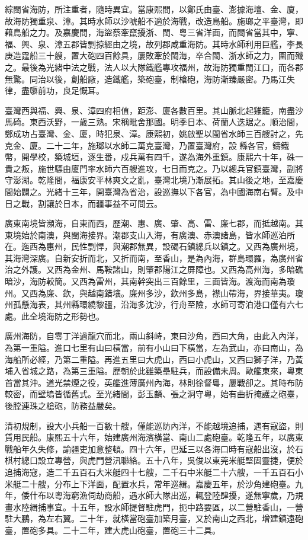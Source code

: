 \begin{pinyinscope}
綜閩省海防，所注重者，隨時異宜。當康熙間，以鄭氏由臺、澎據海壇、金、廈，故海防獨重泉、漳。其時水師以沙唬船不適於海戰，改造鳥船。施瑯之平臺灣，即藉鳥船之力。及嘉慶間，海盜蔡牽竄擾浙、閩、粵三省洋面，而閩省當其中，寧、福、興、泉、漳五郡皆剽掠經由之境，故列郡咸重海防。其時水師利用巨艦，李長庚造霆船三十艘，置大砲四百餘具，屢敗牽於閩海，卒合閩、浙水師之力，圍而殲之。最後為光緒中法之戰，法人以大隊鐵艦專攻福州，故海防獨重閩江口，而各郡無驚。同治以後，創船廠，造鐵艦，築砲臺，制槍砲，海防漸臻嚴密。乃馬江失律，盡隳前功，良足慨耳。

臺灣西與福、興、泉、漳四府相值，距澎、廈各數百里。其山脈北起雞籠，南盡沙馬碕。東西沃野，一歲三熟。宋稱毗舍那國。明季日本、荷蘭人迭踞之。順治間，鄭成功占臺灣、金、廈，時犯泉、漳。康熙初，姚啟聖以閩省水師三百艘討之，先克金、廈。二十二年，施瑯以水師二萬克臺灣，乃置臺灣府，設縣各官，鑄鐵幣，開學校，築城垣，逐生番，戍兵萬有四千，遂為海外重鎮。康熙六十年，硃一貴之叛，施世驃由廈門率水師六百艘進攻，七日而克之。乃以總兵官鎮臺灣，副將守澎湖。乾隆間，福康安平林爽文之亂，臺灣北境乃漸展拓。其山後之地，至嘉慶間始闢之。光緒十三年，開臺灣為省治，設巡撫以下各官，為中國海南右臂。及中日之戰，割讓於日本，而疆事益不可問云。

廣東南境皆瀕海，自東而西，歷潮、惠、廣、肇、高、雷、廉七郡，而抵越南。其東境始於南澳，與閩海接界。潮郡支山入海，有廣澳、赤澳諸島，皆水師巡泊所在。迤西為惠州，民性剽悍，與潮郡無異，設碣石鎮總兵以鎮之。又西為廣州境，其海灣深廣。自新安折而北，又折而南，至香山，是為內海，群島環羅，為廣州省治之外護。又西為金州、馬鞍諸山，則肇郡陽江之屏障也。又西為高州海，多暗礁暗沙，海防較簡。又西為雷州，其南幹突出三百餘里，三面皆海。渡海而南為瓊州。又西為廉、欽，與越南錯壤。廉州多沙，欽州多島，襟山帶海，界接華夷。瓊州孤懸海表，其州縣環繞黎疆，沿海多沈沙，行舟至險，水師可寄泊港口僅有六七處。此全境海防之形勢也。

廣州海防，自零丁洋過龍穴而北，兩山斜峙，東曰沙角，西曰大角，由此入內洋，為第一重隘。進口七里有山曰橫當，前有小山曰下橫當，左為武山，亦曰南山，為海船所必經，乃第二重隘。再進五里曰大虎山，西曰小虎山，又西曰獅子洋，乃黃埔入省城之路，為第三重隘。歷朝於此雖築壘駐兵，而設備未周。歐艦東來，粵東首當其沖。道光禁煙之役，英艦進薄廣州內海，林則徐督粵，屢戰卻之。其時布防較密，而壁塢皆循舊式。至光緒間，彭玉麟、張之洞守粵，始有曲折掩護之砲臺，後膛連珠之槍砲，防務益嚴矣。

清初規制，設大小兵船一百數十艘，僅能巡防內洋，不能越境追捕，遇有寇盜，則賃用民船。康熙五十六年，始建廣州海濱橫當、南山二處砲臺。乾隆五年，以廣東戰船年久失修，諭疆吏加意整頓。四十六年，巴延三以各海口時有寇船出沒，於石棋村總口設立專營，與虎門營汛聯絡。五十八年，吳俊以東莞米艇堅固靈捷，便於追捕海寇，造二千五百石大米艇四十七艘，二千石中米艇二十六艘，一千五百石小米艇二十艘，分布上下洋面，配置水兵，常年巡緝。嘉慶五年，於沙角建砲臺。九年，倭什布以粵海窮漁伺劫商船，遇水師大隊出巡，輒登陸肆擾，遂無寧歲，乃規畫水陸緝捕事宜。十五年，設水師提督駐虎門，扼中路要區，以二營駐香山，一營駐大鵬，為左右翼。二十年，就橫當砲臺加築月臺，又於南山之西北，增建鎮遠砲臺，置砲多具。二十二年，建大虎山砲臺，置砲三十二具。


\end{pinyinscope}
